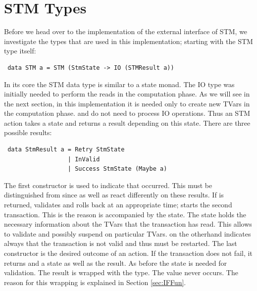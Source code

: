 \section{STM Types}
\label{STMTypes}
Before we head over to the implementation of the external interface of STM, we investigate the types
that are used in this implementation; starting with the STM type itself:
\begin{lstlisting}
 data STM a = STM (StmState -> IO (STMResult a))
\end{lstlisting}
In its core the STM data type is similar to a state monad. The IO type was initially needed to perform the reads 
in the computation phase. As we will see in the next section, in this implementation it is needed only to create new TVars
in the computation phase.  and  do not need to process IO operations.
Thus an STM action takes a state and returns a result depending on this state. There are three possible 
results:
\begin{lstlisting}
 data StmResult a = Retry StmState
                  | InValid
                  | Success StmState (Maybe a)
\end{lstlisting}
The first constructor is used to indicate that  occurred. This must be distinguished from 
 since  as well as  react differently on these results. If 
 is returned,  validates and rolls back at an appropriate time;  
starts the second transaction. This is the reason  is accompanied by the state.
The state holds the necessary information about the TVars that the transaction has read. This allows 
to validate and possibly suspend on particular TVars.  on the otherhand indicates
always that the transaction is not valid and thus must be restarted. 
The last constructor is the desired outcome of an action. If the transaction does not fail, it returns
 and a state as well as the result. As before the state is needed for validation.
The result is wrapped with the  type. The value  never occurs. 
The reason for this wrapping is explained in Section \ref{sec:IFFun}. 

